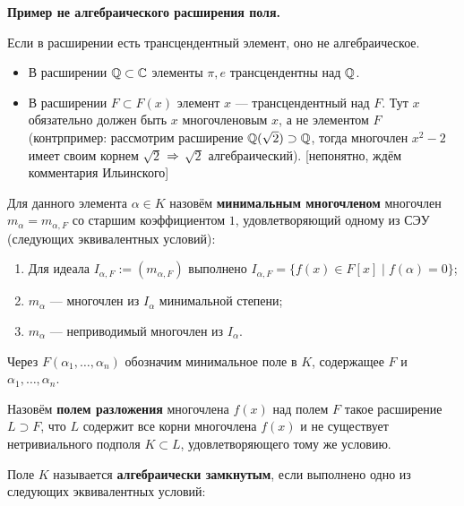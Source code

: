 
\textbf{Пример не алгебраического расширения поля.}

Если в расширении есть трансцендентный элемент, оно не алгебраическое.

\begin{itemize}
\tightlist
\item
  В расширении \(\mathbb{Q} \subset \mathbb{C}\) элементы \(\pi, e\) трансцендентны над \(\mathbb{Q}\).
\item
  В расширении \(F \subset F(x)\) элемент \(x\) --- трансцендентный над \(F\). Тут \(x\) обязательно должен быть \(x\) многочленовым \(x\), а не элементом \(F\) (контрпример: рассмотрим расширение \(\mathbb{Q}(\sqrt{2}) \supset \mathbb{Q}\), тогда многочлен \(x^2-2\) имеет своим корнем \(\sqrt{2}\) \(\Rightarrow\) \(\sqrt{2}\) алгебраический). {[}непонятно, ждём комментария Ильинского{]}
\end{itemize}


Для данного элемента \(\alpha \in K\) назовём \textbf{минимальным многочленом} многочлен \(m_{\alpha} = m_{\alpha,F}\) со старшим коэффициентом \(1\), удовлетворяющий одному из СЭУ (следующих эквивалентных условий):

\begin{enumerate}
\def\labelenumi{\arabic{enumi}.}
\tightlist
\item
  Для идеала \(I_{\alpha, F} := (m_{\alpha, F})\) выполнено \(I_{\alpha,F} = \{f(x) \in F[x] \mid f(\alpha)=0\}\);
\item
  \(m_{\alpha}\) --- многочлен из \(I_{\alpha}\) минимальной степени;
\item
  \(m_{\alpha}\) --- неприводимый многочлен из \(I_{\alpha}\).
\end{enumerate}


Через \(F(\alpha_1,\ldots,\alpha_n)\) обозначим минимальное поле в \(K\), содержащее \(F\) и \(\alpha_1,\ldots,\alpha_n\).

Назовём \textbf{полем разложения} многочлена \(f(x)\) над полем \(F\) такое расширение \(L \supset F\), что \(L\) содержит все корни многочлена \(f(x)\) и не существует нетривиального подполя \(K \subset L\), удовлетворяющего тому же условию.

Поле \(K\) называется \textbf{алгебраически замкнутым}, если выполнено одно из следующих эквивалентных условий:

